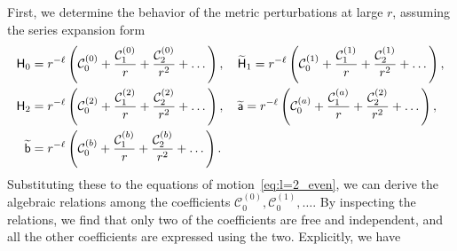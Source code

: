 \documentclass[aps,prd,preprintnumbers,superscriptaddress,nofootinbib,notitlepage]{revtex4-2}
\begin{document}
First, we determine the behavior of the metric perturbations at large $r$,
assuming the series expansion form
\begin{align}
    \mathsf{H}_0&=r^{-\ell}\left(\mathcal{C}_0^{(0)}+\frac{\mathcal{C}_1^{(0)}}{r}+\frac{\mathcal{C}_2^{(0)}}{r^2}+\dots\right),\quad
    \widetilde{\mathsf{H}}_1=r^{-\ell}\left(\mathcal{C}_0^{(1)}+\frac{\mathcal{C}_1^{(1)}}{r}+\frac{\mathcal{C}_2^{(1)}}{r^2}+\dots\right),\notag \\
    \mathsf{H}_2&=r^{-\ell}\left(\mathcal{C}_0^{(2)}+\frac{\mathcal{C}_1^{(2)}}{r}+\frac{\mathcal{C}_2^{(2)}}{r^2}+\dots\right),\quad 
    \widetilde{\mathsf{a}}=r^{-\ell}\left(\mathcal{C}_0^{(a)}+\frac{\mathcal{C}_1^{(a)}}{r}+\frac{\mathcal{C}_2^{(2)}}{r^2}+\dots\right),\notag \\
    \widetilde{\mathsf{b}}&=r^{-\ell}\left(\mathcal{C}_0^{(b)}+\frac{\mathcal{C}_1^{(b)}}{r}+\frac{\mathcal{C}_2^{(b)}}{r^2}+\dots\right).
\end{align}
Substituting these to the equations of motion~\eqref{eq:l=2_even},
we can derive the algebraic relations among the coefficients $\mathcal{C}_0^{(0)}, \mathcal{C}_0^{(1)}, \dots$.
By inspecting the relations, we find that only two of the coefficients are free and independent, and all the other coefficients are expressed using the two.
Explicitly, we have
\end{document}
